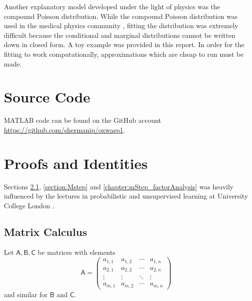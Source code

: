 \documentclass[12pt]{report}
\newcommand{\matr}[1]{\mathsf{#1}}
\begin{document}
Another explanatory model developed under the light of physics was the compound Poisson distribution. While the compound Poisson distribution was used in the medical physics community \cite{whiting2006properties}, fitting the distribution was extremely difficult because the conditional and marginal distributions cannot be written down in closed form. A toy example was provided in this report. In order for the fitting to work computationally, approximations which are cheap to run must be made.

\appendix

\chapter{Source Code}
MATLAB code can be found on the GitHub account \url{https://github.com/shermanip/oxwasp1}.

\chapter{Proofs and Identities}
Sections \ref{chapter:matrixCalculus}, \ref{section:Mstep} and \ref{chapter:mStep_factorAnalysis} was heavily influenced by the lectures in probabilistic and unsupervised learning at University College London \cite{sahani2014probabilistic}.

\section{Matrix Calculus}\label{chapter:matrixCalculus}
Let $\matr{A},\matr{B},\matr{C}$ be matrices with elements
\begin{equation*}
\matr{A}=
\begin{pmatrix}
a_{1,1}&a_{1,2}&\cdots&a_{1,n} \\
a_{2,1}&a_{2,2}&\cdots&a_{2,n} \\
\vdots&\vdots&\ddots&\vdots \\
a_{m,1}&a_{m,2}&\cdots&a_{m,n} 
\end{pmatrix}
\end{equation*}
and similar for $\matr{B}$ and $\matr{C}$.
\end{document}
